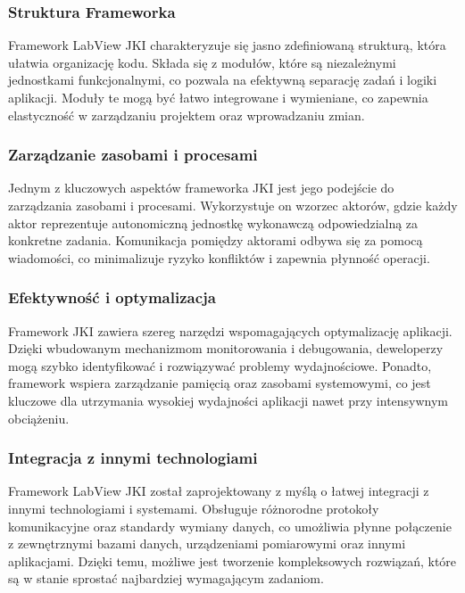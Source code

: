 \documentclass{report}
\begin{document}
\subsubsection*{Struktura Frameworka}

Framework LabView JKI charakteryzuje się jasno zdefiniowaną strukturą, która ułatwia organizację kodu. Składa się z modułów, które są niezależnymi jednostkami funkcjonalnymi, co pozwala na efektywną separację zadań i logiki aplikacji. Moduły te mogą być łatwo integrowane i wymieniane, co zapewnia elastyczność w zarządzaniu projektem oraz wprowadzaniu zmian.

\subsubsection*{Zarządzanie zasobami i procesami}

Jednym z kluczowych aspektów frameworka JKI jest jego podejście do zarządzania zasobami i procesami. Wykorzystuje on wzorzec aktorów, gdzie każdy aktor reprezentuje autonomiczną jednostkę wykonawczą odpowiedzialną za konkretne zadania. Komunikacja pomiędzy aktorami odbywa się za pomocą wiadomości, co minimalizuje ryzyko konfliktów i zapewnia płynność operacji.

\subsubsection*{Efektywność i optymalizacja}

Framework JKI zawiera szereg narzędzi wspomagających optymalizację aplikacji. Dzięki wbudowanym mechanizmom monitorowania i debugowania, deweloperzy mogą szybko identyfikować i rozwiązywać problemy wydajnościowe. Ponadto, framework wspiera zarządzanie pamięcią oraz zasobami systemowymi, co jest kluczowe dla utrzymania wysokiej wydajności aplikacji nawet przy intensywnym obciążeniu.

\subsubsection*{Integracja z innymi technologiami}

Framework LabView JKI został zaprojektowany z myślą o łatwej integracji z innymi technologiami i systemami. Obsługuje różnorodne protokoły komunikacyjne oraz standardy wymiany danych, co umożliwia płynne połączenie z zewnętrznymi bazami danych, urządzeniami pomiarowymi oraz innymi aplikacjami. Dzięki temu, możliwe jest tworzenie kompleksowych rozwiązań, które są w stanie sprostać najbardziej wymagającym zadaniom.
\end{document}
